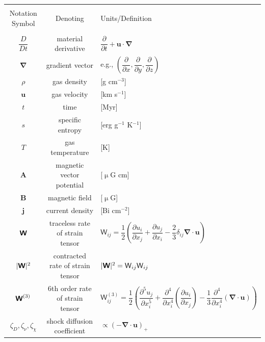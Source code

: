 \documentclass[iop,apj,numberedappendix,twocolappendix]{emulateapj}
\newcommand{\mathbfss}[1]{\textbf{\textsf{#1}}}
\newcommand{\vect}[1]{\boldsymbol{#1}}
\begin{document}
\begin{table}[h]
\begin{tabular}{ccl}
\hline\hline\\
{Notation Symbol} & {Denoting} & {Units/Definition}\\\hline\\
 $\dfrac{D}{Dt}$ & material derivative & $\dfrac{\partial }{\partial t}+\vect{u}\cdot \vect\nabla$ \\
 $\vect\nabla$ & gradient vector & e.g., $\left(\dfrac{\partial }{\partial x},\dfrac{\partial }{\partial y},\dfrac{\partial }{\partial z}\right)$ \\
 $\rho$ & gas density & [g cm$^{-3}$]  \\
 $\vect u$ & gas velocity & [km s$^{-1}$] \\
 $t$ & time & [Myr] \\
 $s$ & specific entropy & [erg g$^{-1}$ K$^{-1}$] \\
 $T$ & gas temperature & [K] \\
 $\vect A$ & magnetic vector potential & [$\upmu$G cm] \\
 $\vect B$ & magnetic field & [$\upmu$G] \\
 $\vect j$ & current density & [Bi cm$^{-2}$] \\
 $\mathbfss W$ & traceless rate of strain tensor &
   ${\mathsf W}_{ij} = \dfrac{1}{2}\left(\dfrac{\partial u_i}{\partial x_j}
                  + \dfrac{\partial u_j}{\partial x_i}
                  -\dfrac{2}{3} \delta_{ij}\vect\nabla\cdot \vect u\right)$ \\
 $|\mathbfss W|^2$ & contracted rate of strain tensor &
   $|\mathbfss W|^2={\mathsf W}_{ij}{\mathsf W}_{ij}$\\
 $\mathbfss W^{(3)}$ & 6th order rate of strain tensor &
   ${\mathsf W}_{ij}^{(3)} = \dfrac{1}{2}\left(\dfrac{\partial^5 u_j}{\partial x_i^5}
                  + \dfrac{\partial^4}{\partial x_i^4}\left(\dfrac{\partial u_i}{\partial x_j}\right)
                  -\dfrac{1}{3}\dfrac{\partial^4}{\partial x_i^4}\left(\vect\nabla\cdot \vect u\right)\right)$ \\
 $\zeta_{D},\zeta_{\nu},\zeta_{\chi}$ & shock diffusion coefficient& $\propto \left(-\vect\nabla\cdot\vect u\right)_+$\\

\end{tabular}
\end{table}
\end{document}
